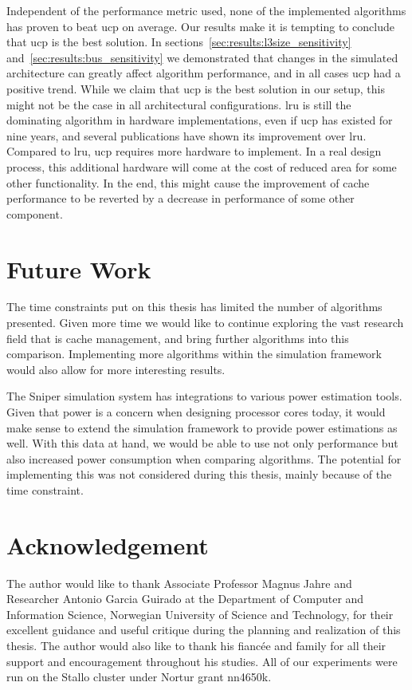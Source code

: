 Independent of the performance metric used, none of the implemented algorithms has proven to beat \gls{ucp} on average.
Our results make it is tempting to conclude that \gls{ucp} is the best solution.
In sections~\ref{sec:results:l3size_sensitivity} and~\ref{sec:results:bus_sensitivity} we demonstrated that changes in the simulated architecture can greatly affect algorithm performance, and in all cases \gls{ucp} had a positive trend.
While we claim that \gls{ucp} is the best solution in our setup, this might not be the case in all architectural configurations.
\gls{lru} is still the dominating algorithm in hardware implementations, even if \gls{ucp} has existed for nine years, and several publications have shown its improvement over \gls{lru}.
Compared to \gls{lru}, \gls{ucp} requires more hardware to implement. 
In a real design process, this additional hardware will come at the cost of reduced area for some other functionality.
In the end, this might cause the improvement of cache performance to be reverted by a decrease in performance of some other component.

\section{Future Work}

The time constraints put on this thesis has limited the number of algorithms presented.
Given more time we would like to continue exploring the vast research field that is cache management, and bring further algorithms into this comparison.
Implementing more algorithms within the simulation framework would also allow for more interesting results.

The Sniper simulation system has integrations to various power estimation tools.
Given that power is a concern when designing processor cores today, it would make sense to extend the simulation framework to provide power estimations as well.
With this data at hand, we would be able to use not only performance but also increased power consumption when comparing algorithms.
The potential for implementing this was not considered during this thesis, mainly because of the time constraint.

\section{Acknowledgement}
The author would like to thank Associate Professor Magnus
Jahre and  Researcher Antonio Garcia Guirado at the Department of Computer and Information Science, Norwegian University of Science and Technology, for their excellent guidance and useful critique during the planning and realization of this thesis.
The author would also like to thank his fiancée and family for all their support and encouragement throughout his studies.
All of our experiments were run on the Stallo cluster under Nortur grant nn4650k.